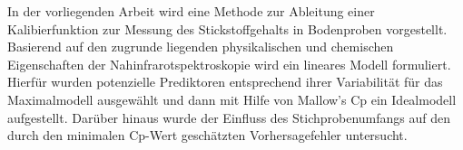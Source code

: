 In der vorliegenden Arbeit wird eine Methode zur Ableitung einer Kalibierfunktion zur Messung des Stickstoffgehalts
in Bodenproben vorgestellt. Basierend auf den zugrunde liegenden physikalischen und chemischen Eigenschaften der Nahinfrarotspektroskopie wird ein lineares Modell formuliert. 
Hierfür wurden potenzielle Prediktoren entsprechend ihrer Variabilität für das Maximalmodell ausgewählt und dann mit Hilfe von Mallow's Cp ein Idealmodell aufgestellt. 
Darüber hinaus wurde der Einfluss des Stichprobenumfangs auf den durch den minimalen Cp-Wert geschätzten Vorhersagefehler untersucht.